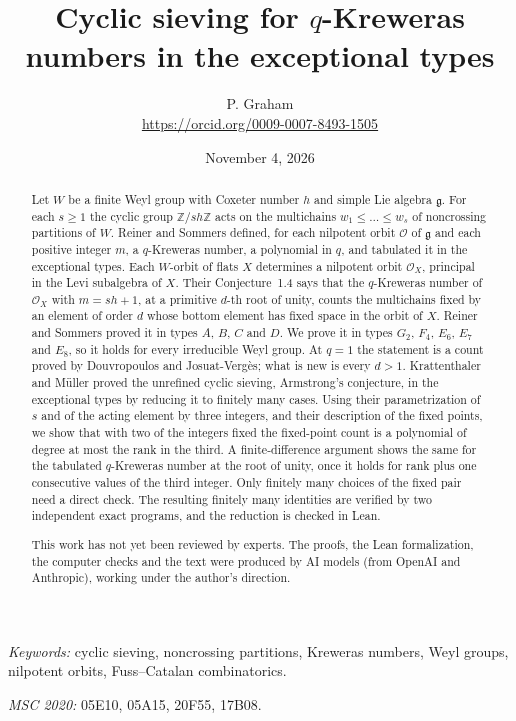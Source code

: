 \documentclass[11pt]{article}
\title{Cyclic sieving for $q$-Kreweras numbers in the exceptional types}
\author{P. Graham\\ \small\url{https://orcid.org/0009-0007-8493-1505}}
\date{November 4, 2026}
\theoremstyle{definition}
\newcommand{\Z}{\mathbb{Z}}
\newcommand{\Oc}{\mathcal{O}}
\begin{document}
\maketitle
\begin{abstract}
Let $W$ be a finite Weyl group with Coxeter number $h$ and simple Lie
algebra $\mathfrak g$. For each $s\ge1$ the cyclic group $\Z/sh\Z$ acts on
the multichains $w_1\le\dots\le w_s$ of noncrossing partitions of $W$.
Reiner and Sommers defined, for each nilpotent orbit $\Oc$ of $\mathfrak g$
and each positive integer $m$, a $q$-Kreweras number, a polynomial in $q$,
and tabulated it in the exceptional types. Each $W$-orbit of flats $X$
determines a nilpotent orbit $\Oc_X$, principal in the Levi subalgebra of
$X$. Their Conjecture~1.4 says that the $q$-Kreweras number of $\Oc_X$ with
$m=sh+1$, at a primitive $d$-th root of unity, counts the multichains fixed
by an element of order $d$ whose bottom element has fixed space in the
orbit of $X$. Reiner and Sommers proved it in types $A$, $B$, $C$ and $D$.
We prove it in types $G_2$, $F_4$, $E_6$, $E_7$ and $E_8$, so it holds for
every irreducible Weyl group. At $q=1$ the statement is a count proved by
Douvropoulos and Josuat-Vergès; what is new is every $d>1$. Krattenthaler
and Müller proved the unrefined cyclic sieving, Armstrong's conjecture, in
the exceptional types by reducing it to finitely many cases. Using their
parametrization of $s$ and of the acting element by three integers, and
their description of the fixed points, we show that with two of the
integers fixed the fixed-point count is a polynomial of degree at most the
rank in the third. A finite-difference argument shows the same for the
tabulated $q$-Kreweras number at the root of unity, once it holds for rank
plus one consecutive values of the third integer. Only finitely many choices of the fixed pair need a
direct check. The resulting finitely many identities are verified by two
independent exact programs, and the reduction is checked in Lean.

This work has not yet been reviewed by experts.
The proofs, the Lean formalization, the computer checks and the text were
produced by AI models (from OpenAI and Anthropic), working under the
author's direction.
\end{abstract}
\medskip
\noindent\textit{Keywords:} cyclic sieving, noncrossing partitions,
Kreweras numbers, Weyl groups, nilpotent orbits, Fuss--Catalan
combinatorics.

\noindent\textit{MSC 2020:} 05E10, 05A15, 20F55, 17B08.
\end{document}
